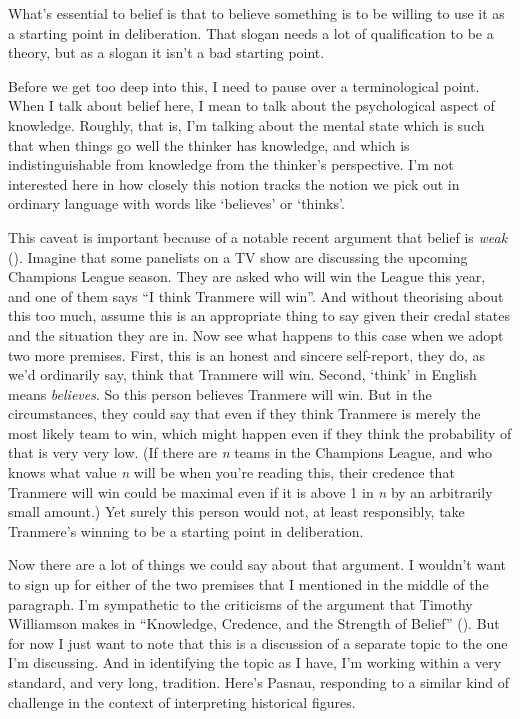 \documentclass[
  12pt,
  letterpaper,
]{scrbook}
\begin{document}
What's essential to belief is that to believe something is to be willing
to use it as a starting point in deliberation. That slogan needs a lot
of qualification to be a theory, but as a slogan it isn't a bad starting
point.

Before we get too deep into this, I need to pause over a terminological
point. When I talk about belief here, I mean to talk about the
psychological aspect of knowledge. Roughly, that is, I'm talking about
the mental state which is such that when things go well the thinker has
knowledge, and which is indistinguishable from knowledge from the
thinker's perspective. I'm not interested here in how closely this
notion tracks the notion we pick out in ordinary language with words
like `believes' or `thinks'.

This caveat is important because of a notable recent argument that
belief is \emph{weak} (). Imagine that some panelists on a TV show
are discussing the upcoming Champions League season. They are asked who
will win the League this year, and one of them says ``I think Tranmere
will win''. And without theorising about this too much, assume this is
an appropriate thing to say given their credal states and the situation
they are in. Now see what happens to this case when we adopt two more
premises. First, this is an honest and sincere self-report, they do, as
we'd ordinarily say, think that Tranmere will win. Second, `think' in
English means \emph{believes}. So this person believes Tranmere will
win. But in the circumstances, they could say that even if they think
Tranmere is merely the most likely team to win, which might happen even
if they think the probability of that is very very low. (If there are
\emph{n} teams in the Champions League, and who knows what value
\emph{n} will be when you're reading this, their credence that Tranmere
will win could be maximal even if it is above 1 in \emph{n} by an
arbitrarily small amount.) Yet surely this person would not, at least
responsibly, take Tranmere's winning to be a starting point in
deliberation.

Now there are a lot of things we could say about that argument. I
wouldn't want to sign up for either of the two premises that I mentioned
in the middle of the paragraph. I'm sympathetic to the criticisms of the
argument that Timothy Williamson makes in ``Knowledge, Credence, and the
Strength of Belief'' ().
But for now I just want to note that this is a discussion of a separate
topic to the one I'm discussing. And in identifying the topic as I have,
I'm working within a very standard, and very long, tradition. Here's
Pasnau, responding to a similar kind of challenge in the context of
interpreting historical figures.
\end{document}
